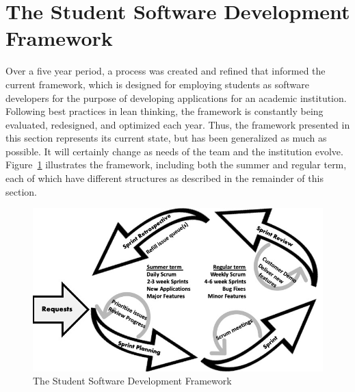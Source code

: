 \section{The Student Software Development Framework}
Over a five year period, a process was created and refined that informed the current framework, which is designed for employing students as software developers for the purpose of developing applications for an academic institution. Following best practices in lean thinking, the framework is constantly being evaluated, redesigned, and optimized each year. Thus, the framework presented in this section represents its current state, but has been generalized as much as possible. It will certainly change as needs of the team and the institution evolve. Figure~\ref{fig:framework} illustrates the framework, including both the summer and regular term, each of which have different structures as described in the remainder of this section. 

\begin{figure}[htbp]
 \centering
 \includegraphics[width=\linewidth]{developmentcycle4.jpg}
 \caption{The Student Software Development Framework}
 \label{fig:framework}
\end{figure}

